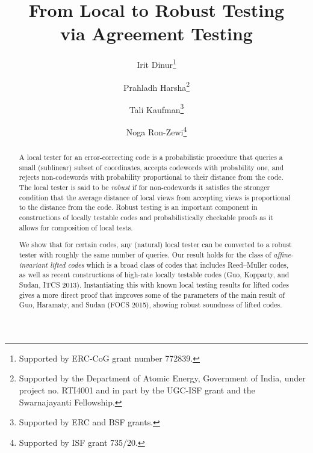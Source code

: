 \documentclass{toc}
\theoremstyle{plain}
\begin{document}
\begin{frontmatter} %
  
%
%

%
%

\title{From Local to Robust Testing\\ via Agreement Testing}

%
%
%
%
%
%
%
%
%
%
%
%


%
%
%
%

%

\author[dinur]{Irit Dinur\thanks{Supported by ERC-CoG grant number 772839.}}
\author[harsha]{Prahladh Harsha\thanks{Supported by  the Department of Atomic Energy, Government of India, under project no. RTI4001 and in part by the UGC-ISF grant and the Swarnajayanti Fellowship.}}
\author[kaufman]{Tali Kaufman\thanks{Supported by ERC and BSF grants.}}
\author[ronzewi]{Noga Ron-Zewi\thanks{Supported by ISF grant 735/20.}}

%
%
%
%

%
%
%
%
%
%
\begin{abstract}
  A local tester for an error-correcting code is a probabilistic procedure that queries a small %
  (sublinear) 
  subset of coordinates, accepts codewords with probability one, and rejects non-codewords with probability proportional to their distance from the code. The local tester is said to be \emph{robust} if for non-codewords it satisfies the stronger
%
condition  %
that the average distance of local views from accepting views is proportional to the distance from the code. Robust testing is an important component in constructions of locally testable codes and probabilistically checkable proofs as it allows for composition of local tests.

%
We show that for certain codes, any (natural) local tester can be converted to a robust tester  with roughly the same number of queries.
Our result holds for the class of \emph{affine-invariant lifted codes} which is a broad class of codes that includes Reed--Muller codes, as well as recent constructions of high-rate locally testable codes (Guo, Kopparty, and Sudan, ITCS 2013).
Instantiating this with known local testing results for lifted codes gives a more direct proof that improves some of the parameters of the main result of Guo, Haramaty, and Sudan (FOCS 2015), showing robust soundness of lifted codes.


\end{abstract}
\end{frontmatter}
\end{document}
